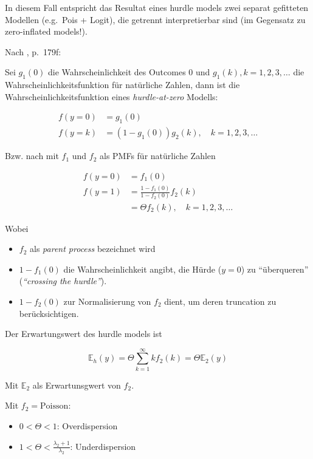 \documentclass[ngerman,a4paper,]{scrartcl}
\providecommand{\tightlist}{%
  \setlength{\itemsep}{0pt}\setlength{\parskip}{0pt}}
\theoremstyle{definition}
\theoremstyle{definition}
\theoremstyle{definition}
\theoremstyle{remark}
\let\BeginKnitrBlock\begin \let\EndKnitrBlock\end
\begin{document}
In diesem Fall entspricht das Resultat eines hurdle models zwei separat gefitteten Modellen (e.g.~Pois + Logit), die getrennt interpretierbar sind (im Gegensatz zu zero-inflated models!).

\BeginKnitrBlock{definition}[Hurdle Model]
\protect\hypertarget{def:unnamed-chunk-4}{}{\label{def:unnamed-chunk-4} \iffalse (Hurdle Model) \fi{} }Nach \citet{winkelmannEconometricAnalysisCount2010}, p.~179f:

Sei \(g_1(0)\) die Wahrscheinlichkeit des Outcomes \(0\) und \(g_1(k), k = 1, 2, 3, \ldots\) die Wahrscheinlichkeitsfunktion für natürliche Zahlen, dann ist die Wahrscheinlichkeitsfunktion eines \emph{hurdle-at-zero} Modells:

\begin{align*}
f(y = 0) &= g_1(0) \\
f(y = k) &= (1 - g_1(0)) g_2(k), \quad k = 1, 2, 3, \ldots
\end{align*}

Bzw. nach \citet{mullahy1986SpecificationTesting} mit \(f_1\) und \(f_2\) als PMFs für natürliche Zahlen

\begin{align*}
f(y = 0) &= f_1(0) \\
f(y = 1) &= \frac{1 - f_1(0)}{1 - f_2(0)} f_2(k) \\
         &= \Theta f_2(k), \quad k = 1, 2, 3, \ldots 
\end{align*}

Wobei

\begin{itemize}
\tightlist
\item
  \(f_2\) als \emph{parent process} bezeichnet wird
\item
  \(1 - f_1(0)\) die Wahrscheinlichkeit angibt, die Hürde (\(y = 0\)) zu \enquote{überqueren} (\emph{\enquote{crossing the hurdle}}).
\item
  \(1 - f_2(0)\) zur Normalisierung von \(f_2\) dient, um deren truncation zu berücksichtigen.
\end{itemize}

Der Erwartungswert des hurdle models ist

\[
  \mathbb{E}_h(y) = \Theta \sum_{k=1}^\infty k f_2(k) = \Theta \mathbb{E}_2(y)
\]

Mit \(\mathbb{E}_2\) als Erwartunsgwert von \(f_2\).

Mit \(f_2 = \mathrm{Poisson}\):

\begin{itemize}
\tightlist
\item
  \(0 < \Theta < 1\): Overdispersion\\
\item
  \(1 < \Theta < \frac{\lambda_2 + 1}{\lambda_2}\): Underdispersion
\end{itemize}
\EndKnitrBlock{definition}
\end{document}

